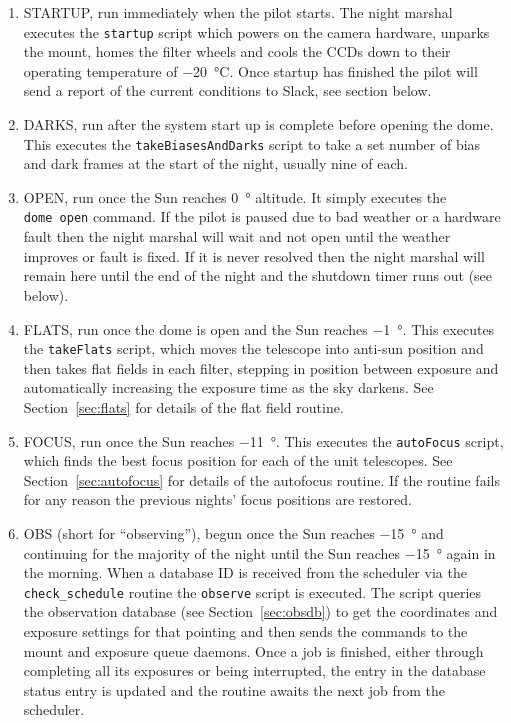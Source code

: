 \begin{colsection}
\begin{colsection}
\begin{enumerate}

\item STARTUP, run immediately when the pilot starts. The night marshal executes the \texttt{startup} script which powers on the camera hardware, unparks the mount, homes the filter wheels and cools the CCDs down to their operating temperature of \SI{-20}{\celsius}. Once startup has finished the pilot will send a report of the current conditions to Slack, see section below.

\item DARKS, run after the system start up is complete before opening the dome. This executes the \texttt{takeBiasesAndDarks} script to take a set number of bias and dark frames at the start of the night, usually nine of each.

\item OPEN, run once the Sun reaches \SI{0}{\degree} altitude. It simply executes the \texttt{dome~open} command. If the pilot is paused due to bad weather or a hardware fault then the night marshal will wait and not open until the weather improves or fault is fixed. If it is never resolved then the night marshal will remain here until the end of the night and the shutdown timer runs out (see below).

\item FLATS, run once the dome is open and the Sun reaches \SI{-1}{\degree}. This executes the \texttt{takeFlats} script, which moves the telescope into anti-sun position and then takes flat fields in each filter, stepping in position between exposure and automatically increasing the exposure time as the sky darkens. See Section~\ref{sec:flats} for details of the flat field routine.

\item FOCUS, run once the Sun reaches \SI{-11}{\degree}. This executes the \texttt{autoFocus} script, which finds the best focus position for each of the unit telescopes. See Section~\ref{sec:autofocus} for details of the autofocus routine. If the routine fails for any reason the previous nights' focus positions are restored.

\item OBS (short for ``observing''), begun once the Sun reaches \SI{-15}{\degree} and continuing for the majority of the night until the Sun reaches \SI{-15}{\degree} again in the morning. When a database ID is received from the scheduler via the \texttt{check\_schedule} routine the \texttt{observe} script is executed. The script queries the observation database (see Section~\ref{sec:obsdb}) to get the coordinates and exposure settings for that pointing and then sends the commands to the mount and exposure queue daemons. Once a job is finished, either through completing all its exposures or being interrupted, the entry in the database status entry is updated and the routine awaits the next job from the scheduler.


\end{enumerate}
\end{colsection}
\end{colsection}
